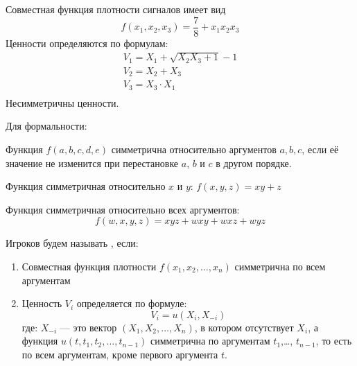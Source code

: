 \begin{myex} Совместная функция плотности сигналов имеет вид
\begin{equation}
f(x_{1},x_{2},x_{3})=\frac{7}{8}+x_{1}x_{2}x_{3}
\end{equation}
Ценности определяются по формулам:
\begin{equation}
\begin{array}{c}
V_{1}=X_{1}+\sqrt{X_{2}X_{3}+1}-1 \\
V_{2}=X_{2}+X_{3} \\
V_{3}=X_{3}\cdot X_{1} \\
\end{array}
\end{equation}
Несимметричны ценности.
\end{myex}

Для формальности:
\begin{mydef}
Функция $ f(a,b,c,d,e) $ симметрична относительно аргументов $ a,b,c $, если её значение не изменится при перестановке $ a$, $b$  и $c$ в другом порядке.
\end{mydef}

\begin{myex} Функция симметричная относительно $ x $ и $ y $: $ f(x,y,z)=xy+z $
\end{myex}

\begin{myex} Функция симметричная относительно всех аргументов:
$$ f(w,x,y,z)=xyz+wxy+wxz+wyz $$
\end{myex}


\begin{mydef} Игроков будем называть , если:
\begin{enumerate}
\item Совместная функция плотности $ f(x_{1},x_{2},\ldots,x_{n}) $ симметрична по всем аргументам
\item Ценность $V_{i}$ определяется по формуле:
\begin{equation}
V_{i}=u(X_{i},X_{-i})
\end{equation}
где: $X_{-i}  $ — это вектор $ (X_{1},X_{2},\ldots,X_{n}) $, в котором отсутствует $ X_{i} $, а  функция $ u(t,t_{1},t_{2},\ldots,t_{n-1}) $ симметрична по аргументам $ t_{1} $,\ldots, $ t_{n-1} $, то есть по всем аргументам, кроме первого аргумента $ t $.

\end{enumerate}
\end{mydef}

